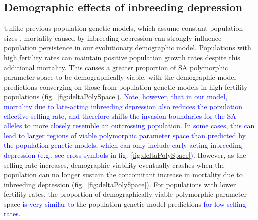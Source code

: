\documentclass[11pt]{article}
\begin{document}
\subsection*{Demographic effects of inbreeding depression} \label{subsec:InbreedEffects}

Unlike previous population genetic models, which assume constant population sizes \citep{JordanConnallon2014,Olito2017}, mortality caused by inbreeding depression can strongly influence population persistence in our evolutionary demographic model. Populations with high fertility rates can maintain positive population growth rates despite this additional mortality. This causes a greater proportion of SA polymorphic parameter space to be demographically viable, with the demographic model predictions converging on those from population genetic models in high-fertility populations (fig.~\ref{fig:deltaPolySpace}).  \textcolor{blue}{Note, however, that in our model, mortality due to late-acting inbreeding depression also reduces the population effective selfing rate, and therefore shifts the invasion boundaries for the SA alleles to more closely resemble an outcrossing population. In some cases, this can lead to larger regions of viable polymorphic parameter space than predicted by the population genetic models, which can only include early-acting inbreeding depression (e.g., see cross symbols in fig.~\ref{fig:deltaPolySpace})}. However, as the selfing rate increases, demographic viability eventually crashes when the population can no longer sustain the concomitant increase in mortality due to inbreeding depression (fig.~\ref{fig:deltaPolySpace}). For populations with lower fertility rates, the proportion of demographically viable polymorphic parameter space \textcolor{blue}{is very similar to} the population genetic model predictions \textcolor{blue}{for low selfing rates}.
\end{document}

